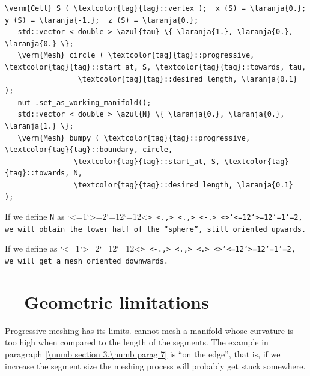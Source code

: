 \begin{Verbatim}[commandchars=\\\{\},formatcom=\small\tt,frame=single,
   label=parag-\ref{\numb section 3.\numb parag 15}.cpp,rulecolor=\color{coment},
   baselinestretch=0.94,framesep=2mm                                            ]
   \verm{Cell} S ( \textcolor{tag}{tag}::vertex );  x (S) = \laranja{0.};  y (S) = \laranja{-1.};  z (S) = \laranja{0.};
   std::vector < double > \azul{tau} \{ \laranja{1.}, \laranja{0.}, \laranja{0.} \};
   \verm{Mesh} circle ( \textcolor{tag}{tag}::progressive, \textcolor{tag}{tag}::start_at, S, \textcolor{tag}{tag}::towards, tau,
                 \textcolor{tag}{tag}::desired_length, \laranja{0.1}                               );
   nut .set_as_working_manifold();
   std::vector < double > \azul{N} \{ \laranja{0.}, \laranja{0.}, \laranja{1.} \};
   \verm{Mesh} bumpy ( \textcolor{tag}{tag}::progressive, \textcolor{tag}{tag}::boundary, circle,
                \textcolor{tag}{tag}::start_at, S, \textcolor{tag}{tag}::towards, N,
                \textcolor{tag}{tag}::desired_length, \laranja{0.1}                 );
\end{Verbatim}

If we define {\small\tt\azul N} as \catcode`<=1\catcode`>=2\catcode`{=12\catcode`}=12<\small\tt {>
<\small\tt {}\laranja.,> <\small\tt {}\laranja.,> <\small\tt \laranja-\laranja.> <\small\tt }>\catcode`<=12\catcode`>=12\catcode`{=1\catcode`}=2, we will obtain
the lower half of the ``sphere'', still oriented upwards.

If we define {\small\tt{}} as \catcode`<=1\catcode`>=2\catcode`{=12\catcode`}=12<\small\tt {>
<\small\tt \laranja-\laranja.,> <\small\tt {}\laranja.,> <\small\tt {}\laranja.> <\small\tt }>\catcode`<=12\catcode`>=12\catcode`{=1\catcode`}=2, we will get a mesh
oriented downwards.


\section{~~Geometric limitations}\label{\numb section 3.\numb parag 16}

Progressive meshing has its limits.
{\ManiFEM} cannot mesh a manifold whose curvature is too high when compared to the
length of the segments.
The example in paragraph \ref{\numb section 3.\numb parag 7} is ``on the edge'', that is,
if we increase the segment size the meshing process will probably get stuck somewhere.


